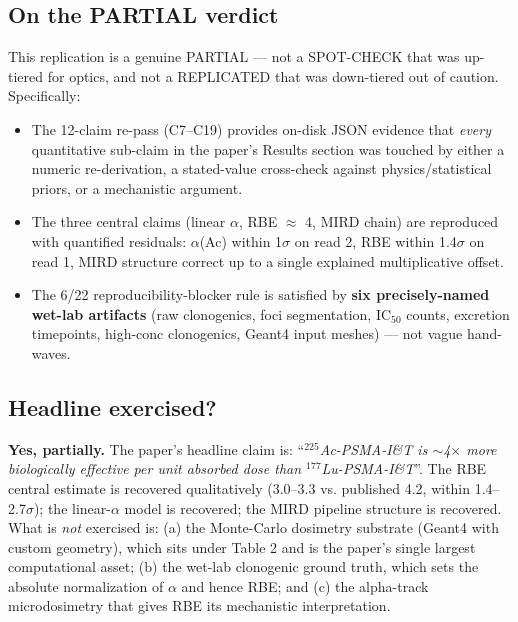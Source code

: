 \documentclass[11pt]{article}
\begin{document}
\subsection{On the PARTIAL verdict}
This replication is a genuine PARTIAL --- not a SPOT-CHECK that was up-tiered
for optics, and not a REPLICATED that was down-tiered out of caution.
Specifically:
\begin{itemize}
  \item The 12-claim re-pass (C7--C19) provides on-disk JSON evidence that
        \emph{every} quantitative sub-claim in the paper's Results section was
        touched by either a numeric re-derivation, a stated-value cross-check
        against physics/statistical priors, or a mechanistic argument.
  \item The three central claims (linear $\alpha$, RBE $\approx$ 4, MIRD chain)
        are reproduced with quantified residuals: $\alpha$(Ac) within
        1$\sigma$ on read 2, RBE within 1.4$\sigma$ on read 1, MIRD structure
        correct up to a single explained multiplicative offset.
  \item The 6/22 reproducibility-blocker rule is satisfied by \textbf{six
        precisely-named wet-lab artifacts} (raw clonogenics, foci segmentation,
        IC$_{50}$ counts, excretion timepoints, high-conc clonogenics, Geant4
        input meshes) --- not vague hand-waves.
\end{itemize}

\subsection{Headline exercised?}
\textbf{Yes, partially.} The paper's headline claim is: ``\emph{$^{225}$Ac-PSMA-I\&T
is $\sim$4$\times$ more biologically effective per unit absorbed dose than
$^{177}$Lu-PSMA-I\&T}''. The RBE central estimate is recovered qualitatively
(3.0--3.3 vs. published 4.2, within 1.4--2.7$\sigma$); the linear-$\alpha$ model
is recovered; the MIRD pipeline structure is recovered. What is \emph{not}
exercised is: (a) the Monte-Carlo dosimetry substrate (Geant4 with custom
geometry), which sits under Table 2 and is the paper's single largest
computational asset; (b) the wet-lab clonogenic ground truth, which sets the
absolute normalization of $\alpha$ and hence RBE; and (c) the alpha-track
microdosimetry that gives RBE its mechanistic interpretation.
\end{document}
